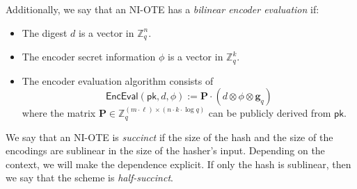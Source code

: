 \documentclass{article}
\newcommand{\Z}{\mathbb{Z}}
\newcommand{\algofont}[1]{\ensuremath{\mathsf{#1}}}
\newcommand{\Enc}{{\algofont{Enc}}}
\newcommand{\Eval}{\algofont{Eval}\xspace}
\newcommand{\pk}{{\mathsf{pk}}}
\begin{document}
Additionally, we say that an NI-OTE has a \emph{bilinear encoder evaluation} if:
\begin{itemize}
    \item The digest $d$ is a vector in $\Z_q^n$.
    \item The encoder secret information $\phi$ is a vector in $\Z_q^k$.
    \item The encoder evaluation algorithm consists of
    \[
    \Enc\Eval(\pk, d, \phi):=\mathbf{P}\cdot(d\otimes \phi\otimes \mathbf{g}_q)
    \]
    where the matrix $\mathbf{P} \in\Z_q^{(m\cdot \ell)\times (n\cdot k\cdot \log q)}$ can be publicly derived from $\pk$.
\end{itemize}
%
We say that an NI-OTE is \emph{succinct} if the size of the hash and the size of the encodings are sublinear in the size of the  hasher's input. Depending on the context, we will make the dependence explicit. If only the hash is sublinear, then we say that the scheme is \emph{half-succinct}.
\end{document}

